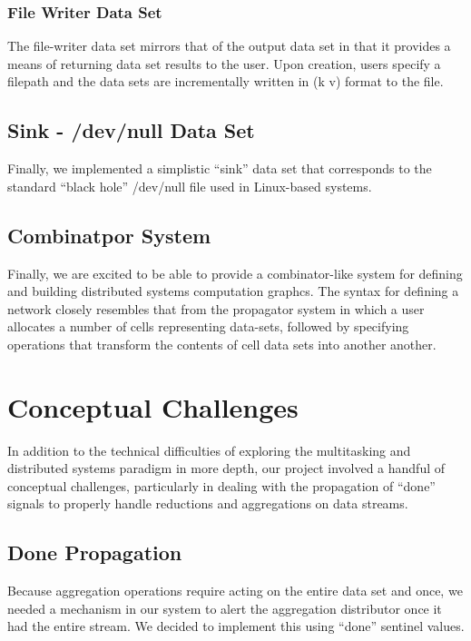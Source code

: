 \documentclass{article}
\begin{document}
\subsubsection{File Writer Data Set}
The file-writer data set mirrors that of the output data set in that
it provides a means of returning data set results to the user. Upon
creation, users specify a filepath and the data sets are incrementally
written in (k v) format to the file.

\subsection{Sink - /dev/null Data Set}

Finally, we implemented a simplistic ``sink'' data set that
corresponds to the standard ``black hole'' /dev/null file used in
Linux-based systems.

\subsection{Combinatpor System}

Finally, we are excited to be able to provide a combinator-like system
for defining and building distributed systems computation graphcs. The
syntax for defining a network closely resembles that from the
propagator system in which a user allocates a number of cells
representing data-sets, followed by specifying operations that
transform the contents of cell data sets into another another.

\section{Conceptual Challenges}

In addition to the technical difficulties of exploring the
multitasking and distributed systems paradigm in more depth, our
project involved a handful of conceptual challenges, particularly
in dealing with the propagation of ``done'' signals to properly handle
reductions and aggregations on data streams.

\subsection{Done Propagation}

Because aggregation operations require acting on the entire data set
and once, we needed a mechanism in our system to alert the aggregation
distributor once it had the entire stream. We decided to implement this
using ``done'' sentinel values.
\end{document}
